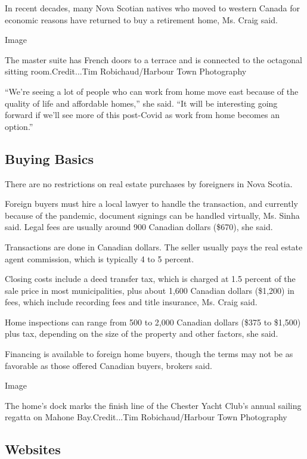In recent decades, many Nova Scotian natives who moved to western Canada
for economic reasons have returned to buy a retirement home, Ms. Craig
said.

Image

The master suite has French doors to a terrace and is connected to the
octagonal sitting room.Credit...Tim Robichaud/Harbour Town Photography

``We're seeing a lot of people who can work from home move east because
of the quality of life and affordable homes,'' she said. ``It will be
interesting going forward if we'll see more of this post-Covid as work
from home becomes an option.''

\hypertarget{buying-basics}{%
\subsection{Buying Basics}\label{buying-basics}}

There are no restrictions on real estate purchases by foreigners in Nova
Scotia.

Foreign buyers must hire a local lawyer to handle the transaction, and
currently because of the pandemic, document signings can be handled
virtually, Ms. Sinha said. Legal fees are usually around 900 Canadian
dollars (\$670), she said.

Transactions are done in Canadian dollars. The seller usually pays the
real estate agent commission, which is typically 4 to 5 percent.

Closing costs include a deed transfer tax, which is charged at 1.5
percent of the sale price in most municipalities, plus about 1,600
Canadian dollars (\$1,200) in fees, which include recording fees and
title insurance, Ms. Craig said.

Home inspections can range from 500 to 2,000 Canadian dollars (\$375 to
\$1,500) plus tax, depending on the size of the property and other
factors, she said.

Financing is available to foreign home buyers, though the terms may not
be as favorable as those offered Canadian buyers, brokers said.

Image

The home's dock marks the finish line of the Chester Yacht Club's annual
sailing regatta on Mahone Bay.Credit...Tim Robichaud/Harbour Town
Photography

\hypertarget{websites}{%
\subsection{Websites}\label{websites}}

